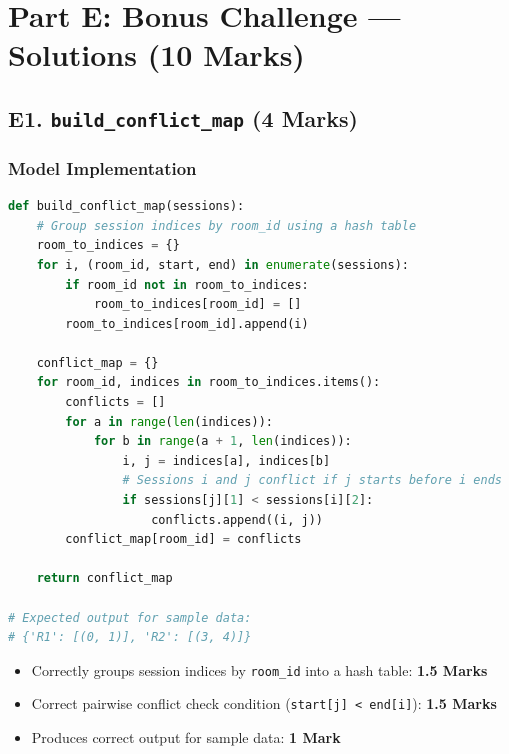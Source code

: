 \documentclass[11pt,a4paper]{article}
\newenvironment{markbox}[1]{%
    \begin{tcolorbox}[colback=markgreen!6!white, colframe=markgreen, title=\textbf{Mark Allocation --- #1}]
}{%
    \end{tcolorbox}
}
\begin{document}
\newpage

\section{Part E: Bonus Challenge --- Solutions (10 Marks)}

\subsection*{E1. \texttt{build\_conflict\_map} (4 Marks)}

\subsubsection*{Model Implementation}
\begin{lstlisting}[language=Python]
def build_conflict_map(sessions):
    # Group session indices by room_id using a hash table
    room_to_indices = {}
    for i, (room_id, start, end) in enumerate(sessions):
        if room_id not in room_to_indices:
            room_to_indices[room_id] = []
        room_to_indices[room_id].append(i)

    conflict_map = {}
    for room_id, indices in room_to_indices.items():
        conflicts = []
        for a in range(len(indices)):
            for b in range(a + 1, len(indices)):
                i, j = indices[a], indices[b]
                # Sessions i and j conflict if j starts before i ends
                if sessions[j][1] < sessions[i][2]:
                    conflicts.append((i, j))
        conflict_map[room_id] = conflicts

    return conflict_map

# Expected output for sample data:
# {'R1': [(0, 1)], 'R2': [(3, 4)]}
\end{lstlisting}

\begin{markbox}{E1 --- 4 Marks}
\begin{itemize}
    \item Correctly groups session indices by \texttt{room\_id} into a hash table: \textbf{1.5 Marks}
    \item Correct pairwise conflict check condition (\texttt{start[j] < end[i]}): \textbf{1.5 Marks}
    \item Produces correct output for sample data: \textbf{1 Mark}
\end{itemize}
\end{markbox}
\end{document}

